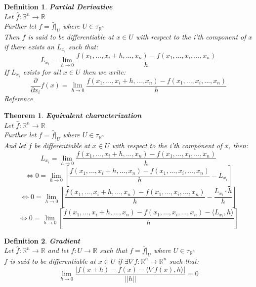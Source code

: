 \documentclass[12pt]{extarticle}
\theoremstyle{plain}
\newtheorem{thm}{Theorem}[section]
\theoremstyle{plain}
\theoremstyle{Definition}
\newtheorem{def.}{Definition}[section]
\theoremstyle{Definition}
\theoremstyle{plain}
\begin{document}
\begin{def.} \textbf{Partial Derivative} \\
	Let $\hat{f} : \mathbb{R}^n \to \mathbb{R}$ \\
	Further let $f = \hat{f}|_U$ where $U \in \tau_{\mathbb{R}^n}$ \\ 
	Then $f$ is said to be differentiable at $x \in U$ with respect to the i'th component of $x$ if there exists an $L_{x_i}$ such that: \\  
	$$L_{x_i} = \lim_{h \to 0} \frac{f(x_1,...,x_i + h,...,x_n) - f(x_1,...,x_i,...,x_n)}{h}$$
	If $L_{x_i}$ exists for all $x \in U$ then we write: \\ 
	$$\frac{\partial}{\partial x_i} f(x) = \lim_{h \to 0} \frac{f(x_1,...,x_i + h,...,x_n) - f(x_1,...,x_i,...,x_n)}{h}$$ 
	\href{https://en.wikipedia.org/wiki/Partial_derivative}{Reference}
\end{def.}
\begin{thm} \textbf{Equivalent characterization} \\ 
	Let $\hat{f} : \mathbb{R}^n \to \mathbb{R}$ \\
	Further let $f = \hat{f}|_U$ where $U \in \tau_{\mathbb{R}^n}$ \\ 
	And let $f$ be differentiable at $x \in U$ with respect to the i'th component of $x$, then: 
	$$L_{x_i} = \lim_{h \to 0} \frac{f(x_1,...,x_i + h,...,x_n) - f(x_1,...,x_i,...,x_n)}{h}$$
	$$\Leftrightarrow 0 = \lim_{h \to 0} \left[\frac{f(x_1,...,x_i + h,...,x_n) - f(x_1,...,x_i,...,x_n)}{h} - L_{x_i}\right]$$
	$$\Leftrightarrow 0 = \lim_{h \to 0} \left[\frac{f(x_1,...,x_i + h,...,x_n) - f(x_1,...,x_i,...,x_n)}{h} - \frac{L_{x_i} \cdot h}{h}\right]$$
	$$\Leftrightarrow 0 = \lim_{h \to 0} \left[\frac{f(x_1,...,x_i + h,...,x_n) - f(x_1,...,x_i,...,x_n) - \langle L_{x_i} , h \rangle}{h}  \right]$$	
\end{thm}
\begin{def.} \textbf{Gradient} \\ 
	Let $\hat{f} : \mathbb{R}^n \to \mathbb{R}$ and let $f : U \to \mathbb{R}$ such that $f = \hat{f}|_U$ where $U \in \tau_{\mathbb{R}^n}$ \\ 
	$f$ is said to be differentiable at $x \in U$ if $\exists \nabla f : \mathbb{R}^n \to \mathbb{R}^n$ such that: \\  	
	$$\lim_{h \to 0}\frac{|f(x + h) - f(x) - \langle \nabla f(x),h \rangle|}{||h||} = 0$$ 
\end{def.} 
\end{document}
